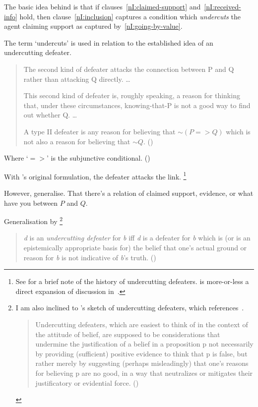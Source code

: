 \begin{note}
  The basic idea behind \nI{} is that if clauses~\ref{nI:claimed-support} and~\ref{nI:received-info} hold, then clause~\ref{nI:inclusion} captures a condition which \emph{undercuts} the agent claiming support as captured by~\ref{nI:going-by-value}.

  The term `undercuts' is used in relation to the established idea of an undercutting defeater.

  \begin{quote}
    The second kind of defeater attacks the connection between P and Q rather than attacking Q directly.
    \dots

    This second kind of defeater is, roughly speaking, a reason for thinking that, under these circumstances, knowing-that-P is not a good way to find out whether Q.
    \dots

    A type II defeater is any reason for believing that \({\sim}(P => Q)\) which is not also a reason for believing that \({\sim}Q\).\nolinebreak
    \mbox{}\hfill\mbox{(\cite[43]{Pollock:1974uk})}
  \end{quote}
  Where `\(=>\)' is the subjunctive conditional. (\Citeyear[42]{Pollock:1974uk})

  With \citeauthor{Pollock:1974uk}'s original formulation, the defeater attacks the link.\nolinebreak
  \footnote{
    See \textcite[196,fn.166]{Pollock:1999tm} for a brief note of the history of undercutting defeaters.
    \textcite{Pollock:1974uk} is more-or-less a direct expansion of discussion in~\textcite{Pollock:1970un}.
  }

  However, generalise.
  That there's a relation of claimed support, evidence, or what have you between \(P\) and \(Q\).

  Generalisation by \citeauthor{Bergmann:2005ws}\nolinebreak
  \footnote{
    I am also inclined to \citeauthor{Worsnip:2018aa}'s sketch of undercutting defeaters, which references~\citeauthor{Bergmann:2005ws}.
    \begin{quote}
      Undercutting defeaters, which are easiest to think of in the context of the attitude of belief, are supposed to be considerations that undermine the justification of a belief in a proposition p not necessarily by providing (sufficient) positive evidence to think that p is false, but rather merely by suggesting (perhaps misleadingly) that one’s reasons for believing p are no good, in a way that neutralizes or mitigates their justificatory or evidential force.\linebreak
      \mbox{}\hfill\mbox{(\Citeyear[29]{Worsnip:2018aa})}
    \end{quote}
  }
  \begin{quote}
    \emph{d} is an \emph{undercutting defeater} for \emph{b} iff \emph{d} is a defeater for \emph{b} which is (or is an epistemically appropriate basis for) the belief that one's actual ground or reason for \emph{b} is not indicative of \emph{b}'s truth.\nolinebreak
    \mbox{}\hfill\mbox{(\cite[424]{Bergmann:2005ws})}
  \end{quote}


\end{note}

